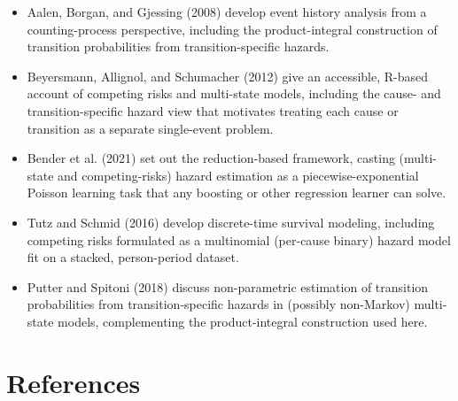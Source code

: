 \documentclass[
  letterpaper,
  krantz2]{style/krantz}
\providecommand{\tightlist}{%
  \setlength{\itemsep}{0pt}\setlength{\parskip}{0pt}}
\begin{document}
\begin{tcolorbox}[enhanced jigsaw, toprule=.15mm, bottomtitle=1mm, opacityback=0, breakable, leftrule=.75mm, title={Further reading}, toptitle=1mm, bottomrule=.15mm, colback=white, colframe=quarto-callout-tip-color-frame, titlerule=0mm, opacitybacktitle=0.6, coltitle=black, rightrule=.15mm, left=2mm, colbacktitle=quarto-callout-tip-color!10!white, arc=.35mm]

\begin{itemize}
\tightlist
\item
  Aalen, Borgan, and Gjessing (2008) develop event history analysis from
  a counting-process perspective, including the product-integral
  construction of transition probabilities from transition-specific
  hazards.
\item
  Beyersmann, Allignol, and Schumacher (2012) give an accessible,
  R-based account of competing risks and multi-state models, including
  the cause- and transition-specific hazard view that motivates treating
  each cause or transition as a separate single-event problem.
\item
  Bender et al. (2021) set out the reduction-based framework, casting
  (multi-state and competing-risks) hazard estimation as a
  piecewise-exponential Poisson learning task that any boosting or other
  regression learner can solve.
\item
  Tutz and Schmid (2016) develop discrete-time survival modeling,
  including competing risks formulated as a multinomial (per-cause
  binary) hazard model fit on a stacked, person-period dataset.
\item
  Putter and Spitoni (2018) discuss non-parametric estimation of
  transition probabilities from transition-specific hazards in (possibly
  non-Markov) multi-state models, complementing the product-integral
  construction used here.
\end{itemize}

\end{tcolorbox}

\backmatter
{}

\chapter*{References}\label{references}
\end{document}
